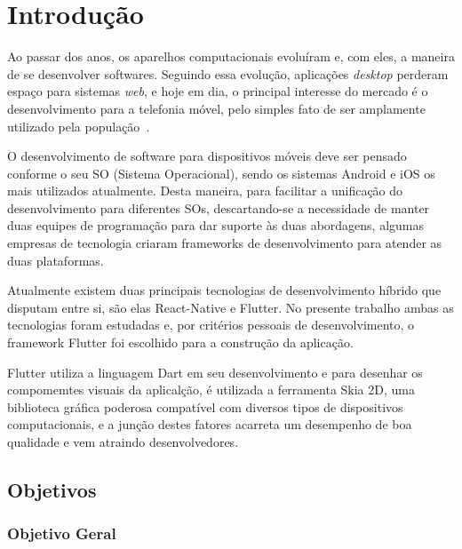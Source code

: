 
\chapter{Introdução}\label{ch:intro}

Ao passar dos anos, os aparelhos computacionais evoluíram e, com eles, a maneira de se desenvolver softwares.
Seguindo essa evolução, aplicações \textit{desktop} perderam espaço para sistemas \textit{web}, e hoje em dia, o principal interesse do mercado é o desenvolvimento para a telefonia móvel, pelo simples fato de ser amplamente utilizado pela população~\cite{leite2017comparativo}.

O desenvolvimento de software para dispositivos móveis deve ser pensado conforme o seu SO (Sistema Operacional), sendo os sistemas Android e iOS os mais utilizados atualmente.
Desta maneira, para facilitar a unificação do desenvolvimento para diferentes SOs, descartando-se a necessidade de manter duas equipes de programação para dar suporte às duas abordagens, algumas empresas de tecnologia criaram frameworks de desenvolvimento para atender as duas plataformas.

Atualmente existem duas principais tecnologias de desenvolvimento híbrido que disputam entre si, são elas React-Native e Flutter.
No presente trabalho ambas as tecnologias foram estudadas e, por critérios pessoais de desenvolvimento, o framework Flutter foi escolhido para a construção da aplicação.

Flutter utiliza a linguagem Dart em seu desenvolvimento e para desenhar os compomemtes visuais da aplicalção, é utilizada a ferramenta Skia 2D, uma biblioteca gráfica poderosa compatível com diversos tipos de dispositivos computacionais, e a junção destes fatores acarreta um desempenho de boa qualidade e vem atraindo desenvolvedores\cite{zammetti2019practical}.


\section{Objetivos}\label{sec:objetivos}

\subsection{Objetivo Geral}\label{subsec:objetivo-geral}

